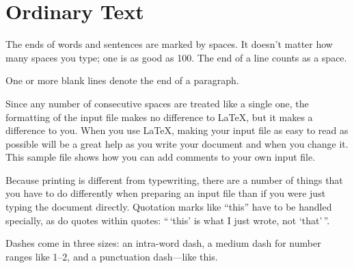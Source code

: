 \documentclass{article}      %
\begin{document}
\pagebreak

\begin{abstract}
This \LaTeX{} template provides example on how to format and display text, 
mathematical formulas, and insert tables or images. There is a lot more you 
can do with \LaTeX{}, for more information check out https://en.wikibooks.org/wiki/LaTeX.
\end{abstract}

\section{Ordinary Text}      %

The ends  of words and sentences are marked 
  by   spaces. It  doesn't matter how many 
spaces    you type; one is as good as 100.  The
end of   a line counts as a space.

One   or more   blank lines denote the  end 
of  a paragraph.  

Since any number of consecutive spaces are treated
like a single one, the formatting of the input
file makes no difference to
      \LaTeX,                %
but it makes a difference to you.  When you use
\LaTeX\cite{lamport94},  %
making your input file as easy to read
as possible will be a great help as you write 
your document and when you change it.  This sample 
file shows how you can add comments to your own input 
file.

Because printing is different from typewriting,
there are a number of things that you have to do
differently when preparing an input file than if
you were just typing the document directly.
Quotation marks like
       ``this'' 
have to be handled specially, as do quotes within
quotes:
       ``\,`this'            %
        is what I just 
        wrote, not  `that'\,''.  

Dashes come in three sizes: an 
       intra-word 
dash, a medium dash for number ranges like 
       1--2, 
and a punctuation 
       dash---like 
this.
\end{document}
